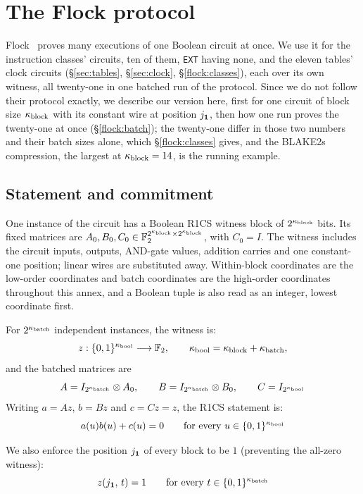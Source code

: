 \section{The Flock protocol}\label{annex:flock}

Flock~\cite{Flock26} proves many executions of one Boolean circuit at once. We use it for the instruction classes' circuits, ten of them, \texttt{EXT} having none, and the eleven tables' clock circuits (\S\ref{sec:tables}, \S\ref{sec:clock}, \S\ref{flock:classes}), each over its own witness, all twenty-one in one batched run of the protocol. Since we do not follow their protocol exactly, we describe our version here, first for one circuit of block size $\kappa_{\mathrm{block}}$ with its constant wire at position $j_{\mathbf{1}}$, then how one run proves the twenty-one at once (\S\ref{flock:batch}); the twenty-one differ in those two numbers and their batch sizes alone, which \S\ref{flock:classes} gives, and the BLAKE2s compression, the largest at $\kappa_{\mathrm{block}}=14$, is the running example.

\subsection{Statement and commitment}\label{flock:statement}

One instance of the circuit has a Boolean R1CS witness block of $2^{\kappa_{\mathrm{block}}}$ bits. Its fixed matrices are $A_0,B_0,C_0\in\mathbb{F}_2^{2^{\kappa_{\mathrm{block}}}\times 2^{\kappa_{\mathrm{block}}}}$, with $C_0=I$. The witness includes the circuit inputs, outputs, AND-gate values, addition carries and one constant-one position; linear wires are substituted away. Within-block coordinates are the low-order coordinates and batch coordinates are the high-order coordinates throughout this annex, and a Boolean tuple is also read as an integer, lowest coordinate first.

For $2^{\kappa_{\mathrm{batch}}}$ independent instances, the witness is:
\[
z:\{0,1\}^{\kappa_{\mathrm{bool}}}\longrightarrow\mathbb{F}_2,\qquad \kappa_{\mathrm{bool}}=\kappa_{\mathrm{block}}+\kappa_{\mathrm{batch}},
\]
and the batched matrices are
\[
A=I_{2^{\kappa_{\mathrm{batch}}}}\otimes A_0,\qquad B=I_{2^{\kappa_{\mathrm{batch}}}}\otimes B_0,\qquad C=I_{2^{\kappa_{\mathrm{bool}}}}
\]
Writing $a=Az$, $b=Bz$ and $c=Cz=z$, the R1CS statement is:
\begin{equation}\label{flock:eq:r1cs}
a(u)b(u)+c(u)=0\qquad\text{for every }u\in\{0,1\}^{\kappa_{\mathrm{bool}}}
\end{equation}

We also enforce the position $j_{\mathbf{1}}$ of every block to be $1$ (preventing the all-zero witness):
\begin{equation}\label{flock:eq:const-one}
z(j_{\mathbf{1}},\,t)=1\qquad\text{for every }t\in\{0,1\}^{\kappa_{\mathrm{batch}}}
\end{equation}

